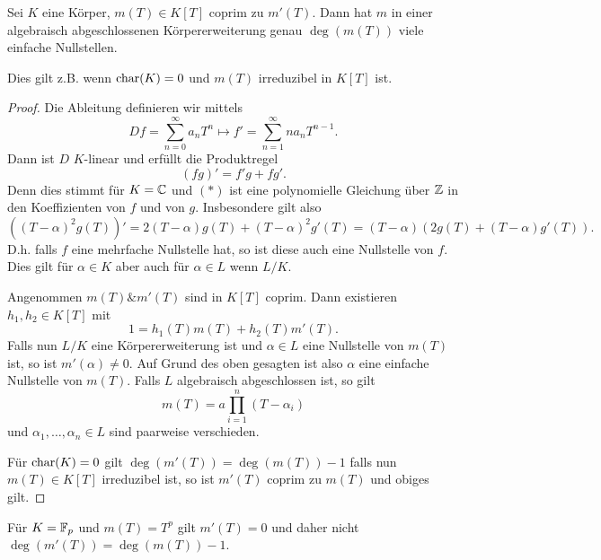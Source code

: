 \begin{lemma}
	Sei $K$ eine Körper, $m(T) \in K[T]$ coprim zu $m'(T)$. Dann hat $m$ in einer algebraisch abgeschlossenen Körpererweiterung
	genau $\deg(m(T))$ viele einfache Nullstellen.

	Dies gilt z.B. wenn $\operatorname{char}(K) = 0$ und $m(T)$ irreduzibel in $K[T]$ ist.
\end{lemma}

\begin{proof}
	Die Ableitung definieren wir mittels
	\[
	Df = \sum_{n=0}^{\infty} a_{n} T^{n} \mapsto f' = \sum_{n=1}^{\infty} n a_{n} T^{n-1}
	.\] 
	Dann ist $D$ $K$-linear und erfüllt die Produktregel
	\[
		(f g)' = f' g + f g' \tag{$*$}
	.\] 
	Denn dies stimmt für $K = \mathbb{C}$ und $(*)$ ist eine polynomielle Gleichung über $\mathbb{Z}$ in den Koeffizienten von $f$ und von $g$.
	Insbesondere gilt also
	\[
		((T-\alpha)^2 g(T))' = 2 (T-\alpha) g(T) + (T-\alpha)^2 g'(T) = (T-\alpha) (2 g(T) + (T-\alpha) g'(T))
	.\] 
	D.h. falls $f$ eine mehrfache Nullstelle hat, so ist diese auch eine Nullstelle von $f$.
	Dies gilt für $\alpha \in K$ aber auch für $\alpha \in L$ wenn $L / K$.

	Angenommen $m(T) \& m'(T)$ sind in $K[T]$ coprim. Dann existieren $h_1,h_2 \in K[T]$ mit
	\[
		1 = h_1(T) m(T) + h_2(T) m'(T)
	.\] 
	Falls nun $L / K$ eine Körpererweiterung ist und $\alpha \in L$ eine Nullstelle von $m(T)$ ist,
	so ist $m'(\alpha) \neq 0$. Auf Grund des oben gesagten ist also $\alpha$ eine einfache Nullstelle von $m(T)$.
	Falls $L$ algebraisch abgeschlossen ist, so gilt
	\[
		m(T) = a \prod_{i=1}^{n} (T-\alpha_{i})
	\] 
	und $\alpha_{1},\ldots, \alpha_{n} \in L$ sind paarweise verschieden.

	Für $\operatorname{char}(K) = 0$ gilt $\deg(m'(T)) = \deg(m(T)) - 1$ falls nun $m(T) \in K[T]$ irreduzibel ist, so ist $m'(T)$ coprim zu $m(T)$ und obiges gilt.
\end{proof}

\begin{remark}
	 Für $K = \mathbb{F}_{p}$ und $m(T) = T^{p}$ gilt $m'(T) = 0$ und daher nicht $\deg(m'(T)) = \deg(m(T)) -1$.
\end{remark}

